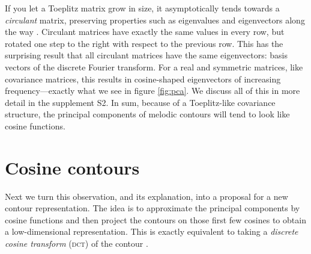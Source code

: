 \documentclass{article}
\begin{document}
If you let a Toeplitz matrix grow in size, it asymptotically tends towards a \emph{circulant} matrix, preserving properties such as eigenvalues and eigenvectors along the way \cite{Gray2006}.
Circulant matrices have exactly the same values in every row, but rotated one step to the right with respect to the previous row.
This has the surprising result that all circulant matrices have the same eigenvectors: basis vectors of the discrete Fourier transform.
For a real and symmetric matrices, like covariance matrices, this results in cosine-shaped eigenvectors of increasing frequency---exactly what we see in figure \ref{fig:pca}.
We discuss all of this in more detail in the supplement S2.
In sum, because of a Toeplitz-like covariance structure, the principal components of melodic contours will tend to look like cosine functions.


\section{Cosine contours}

Next we turn this observation, and its explanation, into a proposal for a new contour representation.
The idea is to approximate the principal components by cosine functions and then project the contours on those first few cosines to obtain a low-dimensional representation.
This is exactly equivalent to taking a \emph{discrete cosine transform} (\textsc{dct}) of the contour \cite{Ahmed1974}.
\end{document}
